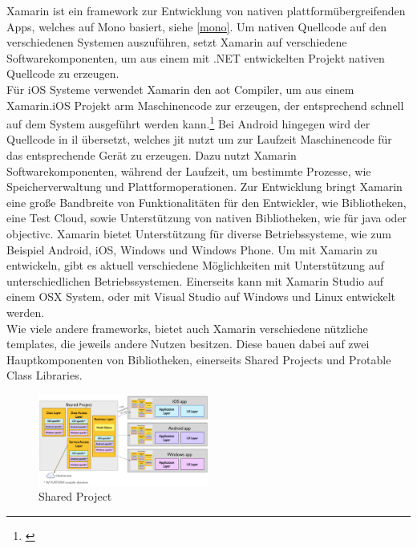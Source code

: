 Xamarin ist ein \gls{framework} zur Entwicklung von nativen plattformübergreifenden Apps, welches auf Mono basiert, siehe \eqref{mono}. Um nativen Quellcode auf den verschiedenen Systemen auszuführen, setzt Xamarin auf verschiedene Softwarekomponenten, um aus einem mit .NET entwickelten Projekt nativen Quellcode zu erzeugen.\\
Für iOS Systeme verwendet Xamarin den \gls{aot} Compiler, um aus einem Xamarin.iOS Projekt \gls{arm} Maschinencode zur erzeugen, der entsprechend schnell auf dem System ausgeführt werden kann.\footnote{\citep[vgl.][Introduction to Mobile Development - Xamarin]{Xamarin.Introductionto}\label{note3}} Bei Android hingegen wird der Quellcode in \gls{il} übersetzt, welches \gls{jit} nutzt um zur Laufzeit Maschinencode für das entsprechende Gerät zu erzeugen. Dazu nutzt Xamarin Softwarekomponenten, während der Laufzeit, um bestimmte Prozesse, wie Speicherverwaltung und Plattformoperationen. Zur Entwicklung bringt Xamarin eine große Bandbreite von Funktionalitäten für den Entwickler, wie Bibliotheken, eine Test Cloud, sowie Unterstützung von nativen Bibliotheken, wie für \gls{java} oder \gls{objectivc}. Xamarin bietet Unterstützung für diverse Betriebssysteme, wie zum Beispiel Android, iOS, Windows und Windows Phone. Um mit Xamarin zu entwickeln, gibt es aktuell verschiedene Möglichkeiten mit Unterstützung auf unterschiedlichen Betriebssystemen. Einerseits kann mit Xamarin Studio auf einem OSX System, oder mit Visual Studio auf Windows und Linux entwickelt werden.\\
Wie viele andere \glspl{framework}, bietet auch Xamarin verschiedene nützliche \glspl{template}, die jeweils andere Nutzen besitzen. Diese bauen dabei auf zwei Hauptkomponenten von Bibliotheken, einerseits Shared Projects und Protable Class Libraries.

\begin{figure}
	\begin{center}
		\includegraphics[width=0.5\textwidth]{images/technische_grundlagen/SharedAssetProject.png}
	\end{center}
	\caption{Shared Project}
	\label{fig:shared}
\end{figure}

